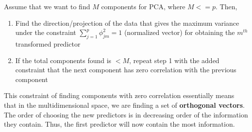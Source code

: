 \documentclass[../statistical_learning_notes.tex]{subfiles}
\begin{document}
    Assume that we want to find $M$ components for PCA, where $M <= p$. Then,
    \begin{enumerate}
        \item Find the direction/projection of the data that gives the maximum variance under the constraint $\sum_{j=1}^{p}\phi_{jm}^{2} = 1$ (normalized vector) for obtaining the $m^{th}$ transformed predictor
        \item If the total components found is $< M$, repeat step 1 with the added constraint that the next component has zero correlation with the previous component
    \end{enumerate}
    This constraint of finding components with zero correlation essentially means that in the multidimensional space, we are finding a set of \textbf{orthogonal vectors}. The order of choosing the new predictors is in decreasing order of the information they contain. Thus, the first predictor will now contain the most information. \newline

\end{document}
